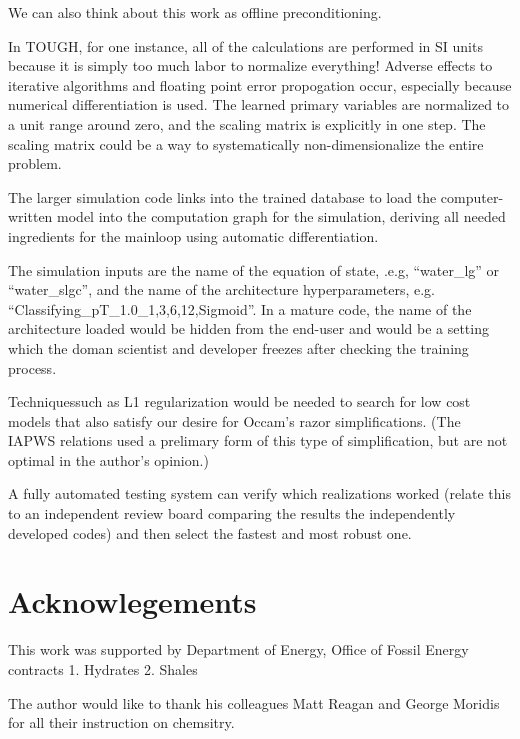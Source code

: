 \documentclass[]{article}
\begin{document}
We can also think about this work as offline preconditioning.

In TOUGH, for one instance, all of the calculations are performed in SI units because it is simply too much labor to normalize everything! Adverse effects to iterative algorithms and floating point error propogation occur, especially because numerical differentiation is used.
The learned primary variables are normalized to a unit range around zero, and the scaling matrix is explicitly in one step. The scaling matrix could be a way to systematically non-dimensionalize the entire problem.

The larger simulation code links into the trained database to load the
computer-written model into the computation graph for the simulation,
deriving all needed ingredients for the mainloop using automatic
differentiation.

The simulation inputs are the name of the equation of state, .e.g,
``water\_lg'' or ``water\_slgc'', and the name of the architecture
hyperparameters, e.g. ``Classifying\_pT\_1.0\_1,3,6,12,Sigmoid''.
In a mature code, the name of the architecture loaded would be hidden
from the end-user and would be a setting which the doman scientist and developer freezes
after checking the training process.

Techniquessuch as L1 regularization would be needed to search for low
cost models that also satisfy our desire for Occam's razor
simplifications. (The IAPWS relations used a prelimary form of this
type of simplification, but are not optimal in the author's opinion.)

A fully automated testing system can verify which realizations worked
(relate this to an independent review board comparing the results the
independently developed codes) and then select the fastest and most
robust one.

\section*{Acknowlegements}

This work was supported by Department of Energy, Office of Fossil
Energy contracts
1. Hydrates
2. Shales

The author would like to thank his colleagues Matt Reagan and George
Moridis for all their instruction on chemsitry. 


\end{document}
